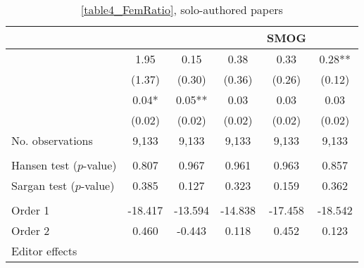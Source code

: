 \begin{table}
    \footnotesize
    \centering
    \begin{threeparttable}
        \caption{\autoref{table4_FemRatio}, solo-authored papers}
        \label{table4_FemSolo}
        \begin{tabular}{p{4cm}S@{}S@{}S@{}S@{}S@{}}
            \toprule
            &{}&{}&{}&{SMOG}&{}\\
            \midrule
            &        1.95   &        0.15   &        0.38   &        0.33   &        0.28** \\
                                          &      (1.37)   &      (0.30)   &      (0.36)   &      (0.26)   &      (0.12)   \\
            &        0.04*  &        0.05** &        0.03   &        0.03   &        0.03   \\
                                          &      (0.02)   &      (0.02)   &      (0.02)   &      (0.02)   &      (0.02)   \\
            \midrule
            No. observations     &       9,133   &       9,133   &       9,133   &       9,133   &       9,133   \\
             \\
            \quad Hansen test (\(p\)-value)&       0.807   &       0.967   &       0.961   &       0.963   &       0.857   \\
            \quad Sargan test (\(p\)-value)&       0.385   &       0.127   &       0.323   &       0.159   &       0.362   \\
             \\
            \quad Order 1&     -18.417   &     -13.594   &     -14.838   &     -17.458   &     -18.542   \\
            \quad Order 2                 &       0.460   &      -0.443   &       0.118   &       0.452   &       0.123   \\
            \midrule
            Editor effects       &           {}   &           {}   &           {}   &           {}   &           {}   \\

\end{tabular}
\end{threeparttable}
\end{table}
